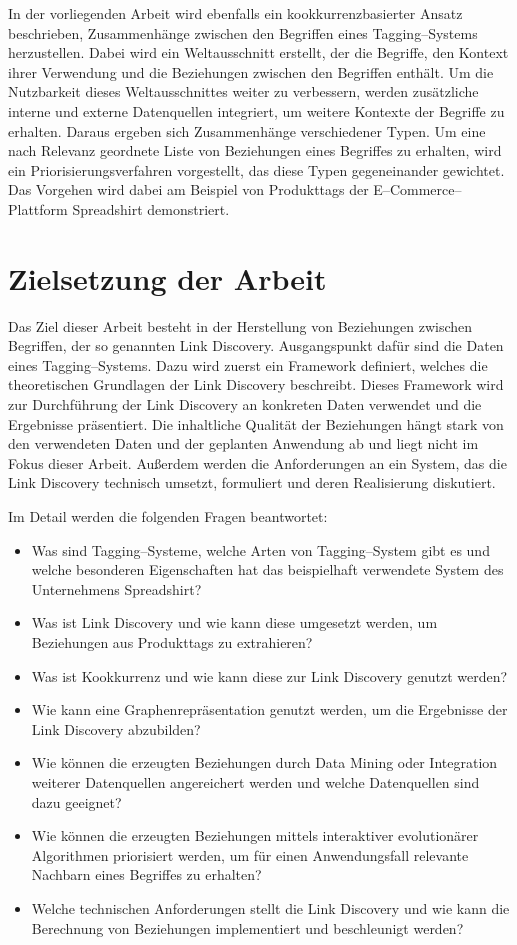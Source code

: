 In der vorliegenden Arbeit wird ebenfalls ein kookkurrenzbasierter Ansatz beschrieben, Zusammenhänge zwischen den Begriffen eines Tagging--Systems herzustellen. Dabei wird ein Weltausschnitt erstellt, der die Begriffe, den Kontext ihrer Verwendung und die Beziehungen zwischen den Begriffen enthält. Um die Nutzbarkeit dieses Weltausschnittes weiter zu verbessern, werden zusätzliche interne und externe Datenquellen integriert, um weitere Kontexte der Begriffe zu erhalten. Daraus ergeben sich Zusammenhänge verschiedener Typen. Um eine nach Relevanz geordnete Liste von Beziehungen eines Begriffes zu erhalten, wird ein Priorisierungsverfahren vorgestellt, das diese Typen gegeneinander gewichtet. Das Vorgehen wird dabei am Beispiel von Produkttags der E--Commerce--Plattform Spreadshirt demonstriert.

\section{Zielsetzung der Arbeit}

Das Ziel dieser Arbeit besteht in der Herstellung von Beziehungen zwischen Begriffen, der so genannten Link Discovery. Ausgangspunkt dafür sind die Daten eines Tagging--Systems. Dazu wird zuerst ein Framework definiert, welches die theoretischen Grundlagen der Link Discovery beschreibt. Dieses Framework wird zur Durchführung der Link Discovery an konkreten Daten verwendet und die Ergebnisse präsentiert. Die inhaltliche Qualität der Beziehungen hängt stark von den verwendeten Daten und der geplanten Anwendung ab und liegt nicht im Fokus dieser Arbeit. Außerdem werden die Anforderungen an ein System, das die Link Discovery technisch umsetzt, formuliert und deren Realisierung diskutiert.

Im Detail werden die folgenden Fragen beantwortet:

\begin{itemize}
    \item Was sind Tagging--Systeme, welche Arten von Tagging--System gibt es und welche besonderen Eigenschaften hat das beispielhaft verwendete System des Unternehmens Spreadshirt?
    \item Was ist Link Discovery und wie kann diese umgesetzt werden, um Beziehungen aus Produkttags zu extrahieren?
    \item Was ist Kookkurrenz und wie kann diese zur Link Discovery genutzt werden?
    \item Wie kann eine Graphenrepräsentation genutzt werden, um die Ergebnisse der Link Discovery abzubilden?
    \item Wie können die erzeugten Beziehungen durch Data Mining oder Integration weiterer Datenquellen angereichert werden und welche Datenquellen sind dazu geeignet?
    \item Wie können die erzeugten Beziehungen mittels interaktiver evolutionärer Algorithmen priorisiert werden, um für einen Anwendungsfall relevante Nachbarn eines Begriffes zu erhalten?
    \item Welche technischen Anforderungen stellt die Link Discovery und wie kann die Berechnung von Beziehungen implementiert und beschleunigt werden?
\end{itemize}


